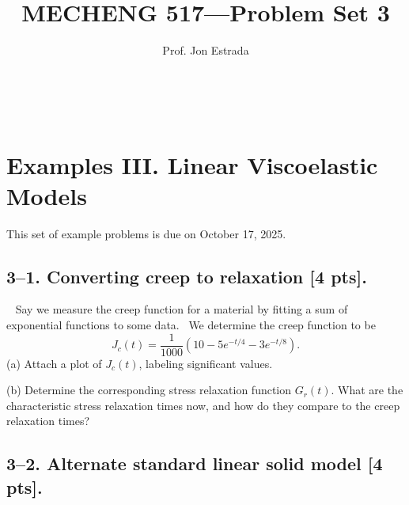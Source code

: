 \documentclass[preprint,12pt,authoryear]{elsarticle}
\begin{document}
\title{MECHENG 517---Problem Set 3} 
\author{Prof. Jon Estrada} 
\maketitle 



\setcounter{section}{3}

\section*{Examples III. Linear Viscoelastic Models}
\label{PS3}

This set of example problems is due on October 17, 2025. 


\medskip
\subsection*{3--1. \textbf{Converting creep to relaxation} [4 pts].} 
Say we measure the creep function for a material by fitting a sum of exponential functions to some data. 
We determine the creep function to be 
\begin{equation}
    J_c(t) = \frac{1}{1000}\left(10 - 5 e^{-t/4} - 3e^{-t/8}\right).
\end{equation}
(a) Attach a plot of $J_c(t)$, labeling significant values.

(b) Determine the corresponding stress relaxation function $G_r(t)$. What are the characteristic stress relaxation times now, and how do they compare to the creep relaxation times? 

\bigskip
\bigskip
\bigskip
\subsection*{3--2. \textbf{Alternate standard linear solid model} [4 pts].}
\end{document}

